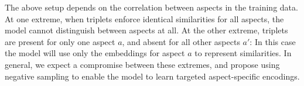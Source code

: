 \documentclass[11pt,a4paper]{article}
\begin{document}

The above setup depends on the correlation between aspects in the training data. At one extreme, when triplets enforce identical similarities for all aspects, the model cannot distinguish between aspects at all. At the other extreme, triplets are present for only one aspect $a$, and absent for all other aspects $a'$: 
In this case the model will use only the embeddings for aspect $a$ to represent similarities.
In general, we expect a compromise between these extremes, and propose using negative sampling to enable the model to learn targeted aspect-specific encodings.%


\end{document}
